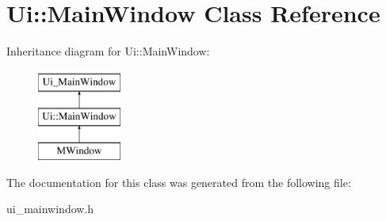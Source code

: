 \hypertarget{class_ui_1_1_main_window}{
\section{Ui::MainWindow Class Reference}
\label{class_ui_1_1_main_window}
}
Inheritance diagram for Ui::MainWindow:\begin{figure}[H]
\begin{center}
\leavevmode
\includegraphics[height=3.000000cm]{class_ui_1_1_main_window}
\end{center}
\end{figure}


The documentation for this class was generated from the following file:\begin{DoxyCompactItemize}
\item 
ui\_\-mainwindow.h\end{DoxyCompactItemize}
